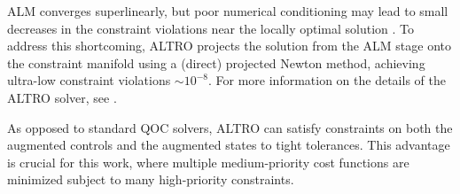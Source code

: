 ALM converges superlinearly, but poor numerical conditioning may lead
to small decreases in the constraint violations near the locally optimal solution
\cite{bertsekas1996constrained}.
To address this shortcoming, ALTRO
projects the solution from the ALM stage onto the constraint manifold using
a (direct) projected Newton method, achieving ultra-low
constraint violations $\sim 10^{-8}$.
For more information on the details of the ALTRO
solver, see \cite{howell2019altro, Jackson2020altroc}.

As opposed to standard QOC solvers, ALTRO
can satisfy constraints
on both the augmented controls and the augmented states to tight tolerances.
This advantage is crucial for this work, where multiple medium-priority cost functions
are minimized subject to many high-priority constraints.
